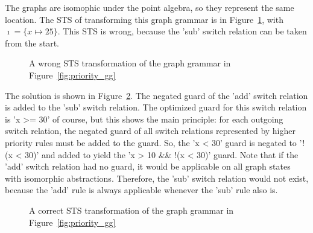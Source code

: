 The graphs are isomophic under the point algebra, so they represent the same location. The STS of transforming this graph grammar is in Figure~\ref{fig:priority_sts_wrong}, with $\imath = \{x \mapsto 25\}$. This STS is wrong, because the 'sub' switch relation can be taken from the start.

\begin{figure}[ht]
  \begin{center}
    
  \end{center}
  \caption{A wrong STS transformation of the graph grammar in Figure~\ref{fig:priority_gg}}
  \label{fig:priority_sts_wrong}
\end{figure}

The solution is shown in Figure~\ref{fig:priority_sts_right}. The negated guard of the 'add' switch relation is added to the 'sub' switch relation. The optimized guard for this switch relation is 'x >= 30' of course, but this shows the main principle: for each outgoing switch relation, the negated guard of all switch relations represented by higher priority rules must be added to the guard. So, the 'x < 30' guard is negated to '!(x < 30)' and added to yield the 'x > 10 \&\& !(x < 30)' guard. Note that if the 'add' switch relation had no guard, it would be applicable on all graph states with isomorphic abstractions. Therefore, the 'sub' switch relation would not exist, because the 'add' rule is always applicable whenever the 'sub' rule also is.

\begin{figure}[ht]
  \begin{center}
    
  \end{center}
  \caption{A correct STS transformation of the graph grammar in Figure~\ref{fig:priority_gg}}
  \label{fig:priority_sts_right}
\end{figure}
